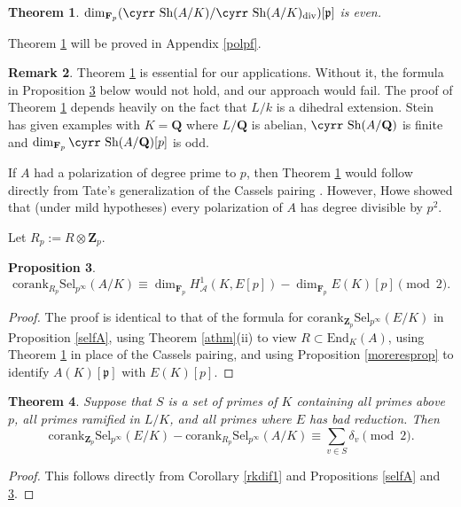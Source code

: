 \documentclass[reqno]{amsart}
\newtheorem{thm}{Theorem}[section]
\newtheorem{prop}[thm]{Proposition}
\theoremstyle{definition}
\newtheorem{rem}[thm]{Remark}
\def\Sh{\mbox{\cyrr Sh}}
\def\Z{\mathbf{Z}}
\def\Q{\mathbf{Q}}
\def\F{\mathbf{F}}
\def\Zp{\Z_p}
\def\Fp{\F_p}
\def\A{\mathcal{A}}
\def\P{\mathfrak{p}}
\def\cork{\mathrm{corank}}
\def\div{\mathrm{div}}
\def\End{\mathrm{End}}
\def\Sel{\mathrm{Sel}}
\def\Hs#1{H^1_{#1}}
\def\HA{\Hs{\A}}
\def\k{k}
\def\rf{\Fp}
\def\Rp{R_p}
\begin{document}
\begin{thm}
\label{pol}
$
\dim_{\rf}(\Sh(A/K)/\Sh(A/K)_\div)[\P]
$
is even.
\end{thm}

Theorem \ref{pol} will be proved in Appendix \ref{polpf}.

\begin{rem}
\label{bad}
Theorem \ref{pol} is essential for our applications.  Without it, 
the formula in Proposition \ref{selfB2} below would not hold, and our 
approach would fail.  
The proof of Theorem \ref{pol} depends heavily on the 
fact that $L/\k$ is a dihedral extension.   
Stein \cite{stein} has given examples with $K = \Q$ where $L/\Q$ is abelian, 
$\Sh(A/\Q)$ is finite and $\dim_{\Fp}\Sh(A/\Q)[p]$ is odd.  

If $A$ had a polarization of degree prime to $p$, then 
Theorem \ref{pol} would follow directly from Tate's 
generalization of the Cassels pairing \cite{tate2}.  However, 
Howe \cite{howe} showed that (under mild hypotheses) 
every polarization of $A$ has degree divisible by $p^2$.
\end{rem}

Let $\Rp := R \otimes \Zp$.

\begin{prop}
\label{selfB2}
$$
\cork_{\Rp}\Sel_{p^\infty}(A/K) 
    \equiv \dim_{\rf}\HA(K,E[p]) - \dim_{\rf}E(K)[p] \pmod{2}.
$$
\end{prop}

\begin{proof}
The proof 
is identical to that of the formula for $\cork_{\Zp}\Sel_{p^\infty}(E/K)$ in 
Proposition \ref{selfA}, using Theorem \ref{athm}(ii) to view $R \subset \End_K(A)$, 
using Theorem \ref{pol} in place of the Cassels pairing, 
and using Proposition \ref{moreresprop} to identify $A(K)[\P]$ with $E(K)[p]$.
\end{proof}

\begin{thm}
\label{rkdif}
Suppose that $S$ is a set of primes of $K$ containing all primes above $p$, 
all primes ramified in $L/K$, and all primes where $E$ has bad 
reduction.  Then
$$
\cork_{\Zp}\Sel_{p^\infty}(E/K) - \cork_{\Rp}\Sel_{p^\infty}(A/K) 
   \equiv \sum_{v \in S} \delta_v \pmod{2}.
$$
\end{thm}

\begin{proof}
This follows directly from Corollary \ref{rkdif1} and Propositions 
\ref{selfA} and \ref{selfB2}.
\end{proof}
\end{document}

